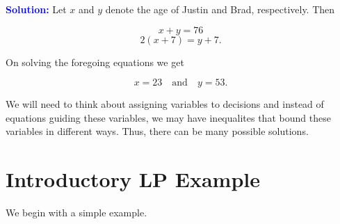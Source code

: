 \bigskip

\noindent \textbf{\textcolor{blue}{Solution:}} Let $x$ and $y$ denote the age of Justin and Brad, respectively. Then

\[
x + y = 76 \tag{1}
\]
\[
2(x + 7) = y + 7. \tag{2}
\]

On solving the foregoing equations we get

\[
x = 23 \quad \text{and} \quad y = 53.
\]

We will need to think about assigning variables to decisions and instead of equations guiding these variables, we may have inequalites that bound these variables in different ways.  Thus, there can be many possible solutions.


\section{Introductory LP Example}
We begin with a simple example.
